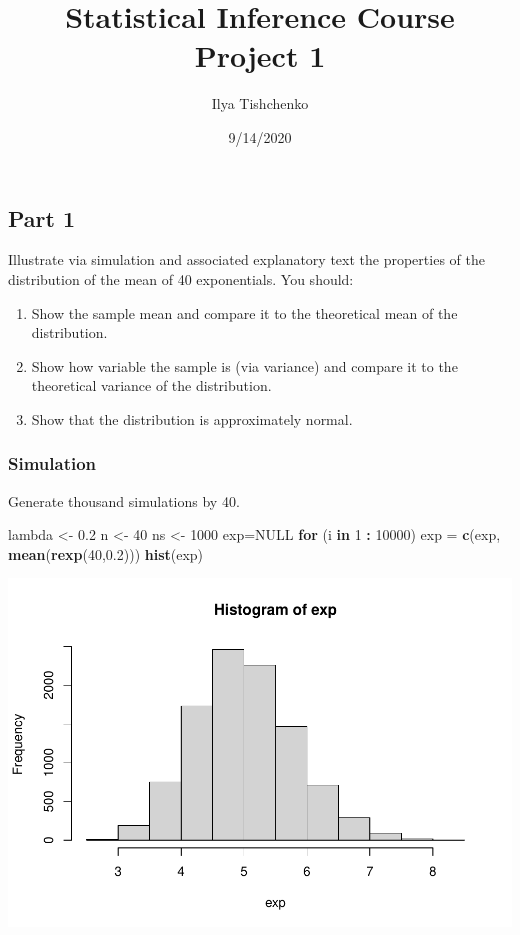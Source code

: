 \documentclass[
]{article}
\title{Statistical Inference Course Project 1}
\author{Ilya Tishchenko}
\date{9/14/2020}
\newenvironment{Shaded}{\begin{snugshade}}{\end{snugshade}}
\newcommand{\ControlFlowTok}[1]{\textcolor[rgb]{0.13,0.29,0.53}{\textbf{#1}}}
\newcommand{\DecValTok}[1]{\textcolor[rgb]{0.00,0.00,0.81}{#1}}
\newcommand{\FloatTok}[1]{\textcolor[rgb]{0.00,0.00,0.81}{#1}}
\newcommand{\KeywordTok}[1]{\textcolor[rgb]{0.13,0.29,0.53}{\textbf{#1}}}
\newcommand{\NormalTok}[1]{#1}
\newcommand{\OperatorTok}[1]{\textcolor[rgb]{0.81,0.36,0.00}{\textbf{#1}}}
\newcommand{\OtherTok}[1]{\textcolor[rgb]{0.56,0.35,0.01}{#1}}
\newcommand{\StringTok}[1]{\textcolor[rgb]{0.31,0.60,0.02}{#1}}
\providecommand{\tightlist}{%
  \setlength{\itemsep}{0pt}\setlength{\parskip}{0pt}}
\begin{document}
\maketitle

\hypertarget{part-1}{%
\subsection{Part 1}\label{part-1}}

Illustrate via simulation and associated explanatory text the properties
of the distribution of the mean of 40 exponentials. You should:

\begin{enumerate}
\def\labelenumi{\arabic{enumi}.}
\tightlist
\item
  Show the sample mean and compare it to the theoretical mean of the
  distribution.
\item
  Show how variable the sample is (via variance) and compare it to the
  theoretical variance of the distribution.
\item
  Show that the distribution is approximately normal.
\end{enumerate}

\hypertarget{simulation}{%
\subsubsection{Simulation}\label{simulation}}

Generate thousand simulations by 40.

\begin{Shaded}
\begin{Highlighting}[]
\NormalTok{lambda <-}\StringTok{ }\FloatTok{0.2}
\NormalTok{n <-}\StringTok{ }\DecValTok{40}
\NormalTok{ns <-}\StringTok{ }\DecValTok{1000}
\NormalTok{exp=}\OtherTok{NULL}
\ControlFlowTok{for}\NormalTok{ (i }\ControlFlowTok{in} \DecValTok{1} \OperatorTok{:}\StringTok{ }\DecValTok{10000}\NormalTok{) exp =}\StringTok{ }\KeywordTok{c}\NormalTok{(exp, }\KeywordTok{mean}\NormalTok{(}\KeywordTok{rexp}\NormalTok{(}\DecValTok{40}\NormalTok{,}\FloatTok{0.2}\NormalTok{)))}
\KeywordTok{hist}\NormalTok{(exp)}
\end{Highlighting}
\end{Shaded}

\includegraphics{CoursePrj1_files/figure-latex/simulation-1.pdf}
\end{document}

